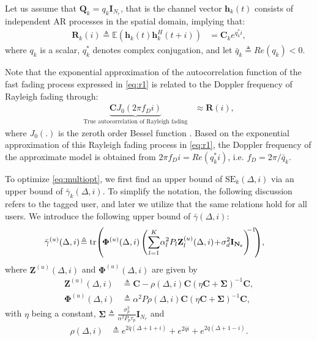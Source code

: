 \documentclass[conference, a4paper, 10pt]{IEEEtran}
\newcommand{\mx}[1]{\mathbf{#1}}
\newcommand{\bs}[1]{\boldsymbol{#1}}
\begin{document}
Let us assume that $\mx{Q}_k=q_k \mx{I}_{N_r}$, that is the
channel vector $\mx{h}_k(t)$ consists of independent \ac{AR} processes in the spatial domain, implying that:
\begin{align}
\label{eq:r1}
\mx{R}_k(i) \triangleq
\mathds{E}\left(\mx{h}_k(t)\mx{h}_k^H(t+i)\right) &= \mx{C}_k e^{q_k^* i},
\end{align}
where $q_k$ is a scalar, $q_k^*$ denotes complex conjugation, and let $\bar{q}_k\triangleq Re(q_k)<0$.

Note that the exponential approximation of the autocorrelation function of the fast fading process expressed
in \eqref{eq:r1} is related to the Doppler frequency of Rayleigh fading through:
\begin{align}
\label{eq:RayleighApprox}
\underbrace{\mx{C}J_0(2 \pi f_D i)}_{\text{True autocorrelation of Rayleigh fading}} &\approx \mx{R}(i),
\end{align}
where $J_0(.)$ is the zeroth order Bessel function \cite{Wang:03}.
Based on the exponential approximation of this Rayleigh fading process in \eqref{eq:r1}, the Doppler frequency of the approximate model is obtained from $2 \pi f_D i = Re(q_k^* i)$, i.e. $f_D = 2 \pi/\bar{q}_k$.

To optimize \eqref{eq:multiopt}, we first find an upper bound of $\text{SE}_k(\Delta,i)$
via an upper bound of $\bar{\gamma}_k(\Delta, i)$.
To simplify the notation, the following discussion refers to the tagged user, and later we utilize that the same relations hold for all users.
We introduce the following upper bound of $\bar{\gamma}(\Delta, i)$:
\begin{align}
\label{eq:upper}
\bar{\gamma}^{(u)}(\Delta, i) \!&\triangleq \textup{tr}\!\left(\! \bs{\Phi}^{(u)}(\Delta, i)  \left(\sum_{l = 1}^K \!\alpha_l^2 P_l \mx{Z}^{(u)}_l(\Delta, i) \!+\! \sigma_d^2 \mx{I_{N_r}}\right)^{\!\!\!-1}  \!\right)\!,
\end{align}
where $\mx{Z}^{(u)}(\Delta, i)$ and $\bs{\Phi}^{(u)}(\Delta, i)$ are given by
\begin{align}
\label{eq:zu}
\mx{Z}^{(u)}(\Delta, i) &\triangleq \mx{C} - \rho(\Delta, i) \mx{C} \left(\eta  \mx{C} + \bs{\Sigma} \right)^{-1} \mx{C},  \\
\label{eq:phiu}
\bs{\Phi}^{(u)}(\Delta, i) &\triangleq \alpha^2 P \rho(\Delta, i) \mx{C} \left( \eta \mx{C} + \bs{\Sigma} \right)^{-1} \mx{C},
\end{align}
with $\eta$ being a constant, $\mx{\Sigma}\triangleq \frac{\sigma_p^2}{\alpha^2P_p \tau_p} \mx{I}_{N_r}$ and
\begin{align}
\label{eq:rho}
\rho(\Delta, i) &\triangleq e^{2\bar{q} (\Delta + 1 + i)} + e^{2\bar{q}  i} + e^{2\bar{q} (\Delta + 1 - i)}.
\end{align}
\end{document}
